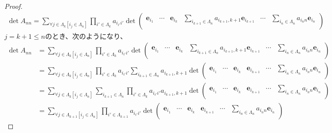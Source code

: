 \documentclass[dvipdfmx]{jsarticle}
\begin{document}
\begin{proof}
\begin{align*}
\det A_{nn} = \sum_{\forall j \in \varLambda_{k}\left[ i_{j} \in \varLambda_{n} \right]} {\prod_{i' \in \varLambda_{k}} a_{i_{i'}i'}\det\begin{pmatrix}
\mathbf{e}_{i_{1}} & \cdots & \mathbf{e}_{i_{k}} & \sum_{i_{k + 1} \in \varLambda_{n}} {a_{i_{k + 1},k + 1}\mathbf{e}_{i_{k + 1}}} & \cdots & \sum_{i_{n} \in \varLambda_{n}} {a_{i_{n}n}\mathbf{e}_{i_{n}}} \\
\end{pmatrix}}
\end{align*}
$j = k + 1 \leq n$のとき、次のようになり、
\begin{align*}
\det A_{nn} &= \sum_{\forall j \in \varLambda_{k}\left[ i_{j} \in \varLambda_{n} \right]} {\prod_{i' \in \varLambda_{k}} a_{i_{i'}i'}\det\begin{pmatrix}
\mathbf{e}_{i_{1}} & \cdots & \mathbf{e}_{i_{k}} & \sum_{i_{k + 1} \in \varLambda_{n}} {a_{i_{k + 1},k + 1}\mathbf{e}_{i_{k + 1}}} & \cdots & \sum_{i_{n} \in \varLambda_{n}} {a_{i_{n}n}\mathbf{e}_{i_{n}}} \\
\end{pmatrix}}\\
&= \sum_{\forall j \in \varLambda_{k}\left[ i_{j} \in \varLambda_{n} \right]} {\prod_{i' \in \varLambda_{k}} a_{i_{i'}i'}\sum_{i_{k + 1} \in \varLambda_{n}} {a_{i_{k + 1},k + 1}\det\begin{pmatrix}
\mathbf{e}_{i_{1}} & \cdots & \mathbf{e}_{i_{k}} & \mathbf{e}_{i_{k + 1}} & \cdots & \sum_{i_{n} \in \varLambda_{n}} {a_{i_{n}n}\mathbf{e}_{i_{n}}} \\
\end{pmatrix}}}\\
&= \sum_{\forall j \in \varLambda_{k}\left[ i_{j} \in \varLambda_{n} \right]} {\sum_{i_{k + 1} \in \varLambda_{n}} {\prod_{i' \in \varLambda_{k}} a_{i_{i'}i'}a_{i_{k + 1},k + 1}\det\begin{pmatrix}
\mathbf{e}_{i_{1}} & \cdots & \mathbf{e}_{i_{k}} & \mathbf{e}_{i_{k + 1}} & \cdots & \sum_{i_{n} \in \varLambda_{n}} {a_{i_{n}n}\mathbf{e}_{i_{n}}} \\
\end{pmatrix}}}\\
&= \sum_{\forall j \in \varLambda_{k + 1}\left[ i_{j} \in \varLambda_{n} \right]} {\prod_{i' \in \varLambda_{k + 1}} a_{i_{i'}i'}\det\begin{pmatrix}
\mathbf{e}_{i_{1}} & \cdots & \mathbf{e}_{i_{k}} & \mathbf{e}_{i_{k + 1}} & \cdots & \sum_{i_{n} \in \varLambda_{n}} {a_{i_{n}n}\mathbf{e}_{i_{n}}} \\

\end{pmatrix}}
\end{align*}
\end{proof}
\end{document}
